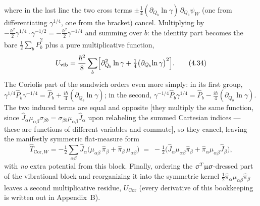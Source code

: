 where in the last line the two cross terms $\pm\tfrac14(\partial_{Q_b}\ln\gamma)\,\partial_{Q_b}\psi_W$ (one from differentiating $\gamma^{1/4}$, one from the bracket) cancel. Multiplying by $-\tfrac{\hbar^2}{2}\gamma^{1/4}\cdot\gamma^{-1/2}=-\tfrac{\hbar^2}{2}\gamma^{-1/4}$ and summing over $b$: the identity part becomes the bare $\tfrac12\sum_b\hat P_b^2$ plus a pure multiplicative function,
\begin{equation}
U_{\mathrm{vib}}=\frac{\hbar^{2}}{8}\sum_b\Bigl[\partial_{Q_b}^{2}\ln\gamma+\tfrac14\bigl(\partial_{Q_b}\!\ln\gamma\bigr)^{2}\Bigr]. \tag{4.34}
\end{equation}
The Coriolis part of the sandwich orders even more simply: in its first group, $\gamma^{1/4}\hat P_b\gamma^{-1/4}=\hat P_b+\tfrac{i\hbar}{4}(\partial_{Q_b}\ln\gamma)$; in the second, $\gamma^{-1/4}\hat P_b\gamma^{1/4}=\hat P_b-\tfrac{i\hbar}{4}(\partial_{Q_b}\ln\gamma)$. The two induced terms are equal and opposite [they multiply the same function, since $\hat J_\alpha\mu_{\alpha\beta}\sigma_{\beta b}=\sigma_{\beta b}\mu_{\alpha\beta}\hat J_\alpha$ upon relabeling the summed Cartesian indices --- these are functions of different variables and commute], so they cancel, leaving the manifestly symmetric flat-measure form
\begin{equation}
\hat T_{\mathrm{Cor},W}=-\tfrac12\sum_{\alpha\beta}\hat J_\alpha\bigl(\mu_{\alpha\beta}\,\hat\pi_\beta+\hat\pi_\beta\,\mu_{\alpha\beta}\bigr)
\;=\;-\tfrac12\bigl(\hat J_\alpha\mu_{\alpha\beta}\hat\pi_\beta+\hat\pi_\alpha\mu_{\alpha\beta}\hat J_\beta\bigr), \tag{4.35}
\end{equation}
with \emph{no} extra potential from this block. Finally, ordering the $\upsigma^{T}\upmu\upsigma$-dressed part of the vibrational block and reorganizing it into the symmetric kernel $\tfrac12\hat\pi_\alpha\mu_{\alpha\beta}\hat\pi_\beta$ leaves a second multiplicative residue, $U_{\mathrm{Cor}}$ (every derivative of this bookkeeping is written out in Appendix~B).

